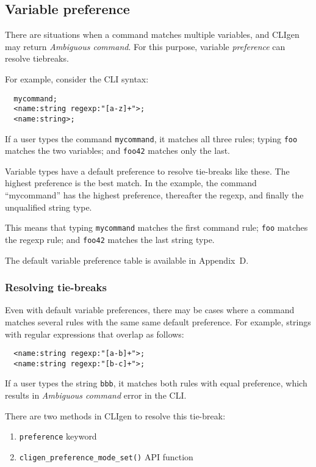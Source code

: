 \documentclass[a4paper, 10pt] {article}
\begin{document}
\subsection{Variable preference}

There are situations when a command matches multiple variables, and CLIgen may return {\em Ambiguous command}. For this purpose, variable {\em preference} can resolve
tiebreaks.

For example, consider the CLI syntax:
\begin{verbatim}
  mycommand;
  <name:string regexp:"[a-z]+">;
  <name:string>;
\end{verbatim}

If a user types the command {\tt mycommand}, it matches all three rules; typing {\tt foo}
matches the two variables; and {\tt foo42} matches only the last.

Variable types have a default preference to resolve tie-breaks like
these. The highest preference is the best match. In the example, the
command ``mycommand'' has the highest preference, thereafter the
regexp, and finally the unqualified string type.

This means that typing {\tt mycommand} matches the first command rule; {\tt foo}
matches the regexp rule; and {\tt foo42} matches the last string type.

The default variable preference table is available in Appendix~D.

\subsubsection{Resolving tie-breaks}

Even with default variable preferences, there may be cases where a
command matches several rules with the same same default
preference. For example, strings with regular expressions that overlap
as follows:
\begin{verbatim}
  <name:string regexp:"[a-b]+">;
  <name:string regexp:"[b-c]+">;
\end{verbatim}
If a user types the string {\tt bbb}, it matches both rules with equal preference, which results in {\em Ambiguous command} error in the CLI.

There are two methods in CLIgen to resolve this tie-break:
\begin{enumerate}
\item {\tt preference} keyword
\item {\tt cligen\_preference\_mode\_set()} API function
\end{enumerate}
\end{document}
